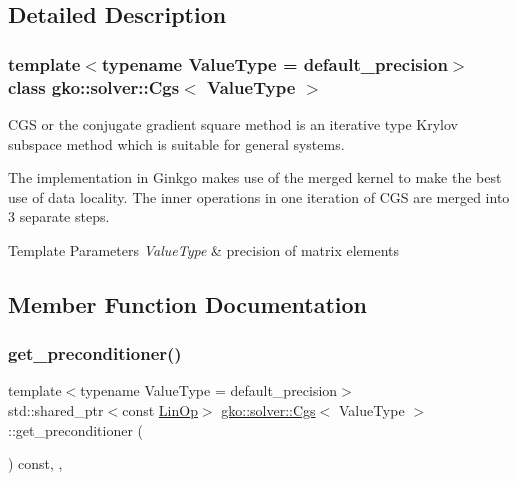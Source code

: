 \subsection{Detailed Description}
\subsubsection*{template$<$typename Value\+Type = default\+\_\+precision$>$\newline
class gko\+::solver\+::\+Cgs$<$ Value\+Type $>$}

C\+GS or the conjugate gradient square method is an iterative type Krylov subspace method which is suitable for general systems. 

The implementation in Ginkgo makes use of the merged kernel to make the best use of data locality. The inner operations in one iteration of C\+GS are merged into 3 separate steps.


\begin{DoxyTemplParams}{Template Parameters}
{\em Value\+Type} & precision of matrix elements \\
\hline
\end{DoxyTemplParams}


\subsection{Member Function Documentation}
\mbox{\label{classgko_1_1solver_1_1Cgs_ad349dc1381dfdcb7a47223908806dcc7}} 
\subsubsection{\texorpdfstring{get\+\_\+preconditioner()}{get\_preconditioner()}}
{\footnotesize\ttfamily template$<$typename Value\+Type  = default\+\_\+precision$>$ \\
std\+::shared\+\_\+ptr$<$const \hyperlink{classgko_1_1LinOp}{Lin\+Op}$>$ \hyperlink{classgko_1_1solver_1_1Cgs}{gko\+::solver\+::\+Cgs}$<$ Value\+Type $>$\+::get\+\_\+preconditioner (\begin{DoxyParamCaption}{ }\end{DoxyParamCaption}) const\hspace{0.3cm}{\ttfamily [inline]}, {\ttfamily [override]}, {\ttfamily [virtual]}}



